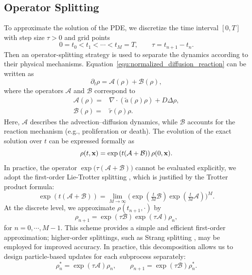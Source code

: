 \documentclass[a4paper,fleqn]{cas-sc}
\theoremstyle{definition}
\theoremstyle{remark}
\begin{document}
\subsection{Operator Splitting}
To approximate the solution of the PDE, we discretize the time interval $[0,T]$ with step size $\tau>0$ and grid points
\[
0 = t_0 < t_1 < \cdots < t_M = T,\qquad \tau=t_{n+1}-t_n.
\]
Then an operator-splitting strategy is used to separate the dynamics according to their physical mechanisms. 
Equation~\eqref{equ:normalized_diffusion_reaction} can be written as
\begin{equation}\label{eq:rho-pde}
\partial_t \rho = \mathcal{A}(\rho) + \mathcal{B}(\rho) ,
\end{equation}
where the operators $\mathcal{A}$ and $\mathcal{B}$ correspond to
\begin{align}
\mathcal{A}(\rho) =& \nabla \cdot \left( \tilde a(\rho)\rho \right) + D\Delta\rho  ,\label{eq:operator-A} \\
\mathcal{B}(\rho) =& \tilde r(\rho)\rho \label{eq:operator-B}.
\end{align}
Here, $\mathcal{A}$ describes the advection--diffusion dynamics, while $\mathcal{B}$ accounts for the reaction mechanism (e.g., proliferation or death).  The evolution of the exact solution over $t$ can be expressed formally as
\begin{equation}\label{}
\rho(t,\mathbf{x}) = \exp\left( t (\mathcal{A} + \mathcal{B}) \right)\rho(0,\mathbf{x}).
\end{equation}
In practice, the operator $\exp\!\big(\tau(\mathcal{A}+\mathcal{B})\big)$ cannot be evaluated explicitly, 
we adopt the first-order Lie-Trotter splitting \cite{trotter1959product}, which is justified by the Trotter product formula:
\begin{equation}
\exp\!\left( t (\mathcal{A} + \mathcal{B}) \right) 
= \lim_{M\to\infty} \Big( \exp\!\left(\tfrac{t}{M} \mathcal{B}\right) 
                          \exp\!\left(\tfrac{t}{M} \mathcal{A}\right) \Big)^M .
\end{equation}
At the discrete level, we approximate $\rho(t_{n+1},\cdot)$ by
\begin{equation}
\rho_{n+1} = \exp(\tau \mathcal{B}) \exp(\tau \mathcal{A}) \rho_n ,
\end{equation}
for $n=0,\cdots,M-1$.
This scheme provides a simple and efficient first-order approximation; 
higher-order splittings, such as Strang splitting \cite{strang1968construction}, may be employed for improved accuracy.
In practice, this decomposition allows us to design particle-based updates for each subprocess separately:
\begin{equation}\label{eq:lie-trotter}
\rho_n^\ast = \exp(\tau \mathcal{A})\rho_n, 
\qquad 
\rho_{n+1} = \exp(\tau \mathcal{B})\rho_n^\ast.
\end{equation}
\end{document}
